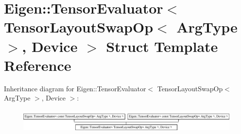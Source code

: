 \hypertarget{struct_eigen_1_1_tensor_evaluator_3_01_tensor_layout_swap_op_3_01_arg_type_01_4_00_01_device_01_4}{}\section{Eigen\+:\+:Tensor\+Evaluator$<$ Tensor\+Layout\+Swap\+Op$<$ Arg\+Type $>$, Device $>$ Struct Template Reference}
\label{struct_eigen_1_1_tensor_evaluator_3_01_tensor_layout_swap_op_3_01_arg_type_01_4_00_01_device_01_4}
Inheritance diagram for Eigen\+:\+:Tensor\+Evaluator$<$ Tensor\+Layout\+Swap\+Op$<$ Arg\+Type $>$, Device $>$\+:\begin{figure}[H]
\begin{center}
\leavevmode
\includegraphics[height=1.225383cm]{struct_eigen_1_1_tensor_evaluator_3_01_tensor_layout_swap_op_3_01_arg_type_01_4_00_01_device_01_4}
\end{center}
\end{figure}
